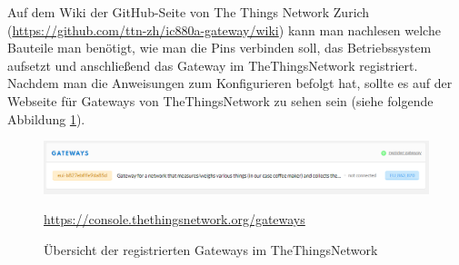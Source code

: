 Auf dem Wiki der GitHub-Seite von The Things Network Zurich (\url{https://github.com/ttn-zh/ic880a-gateway/wiki}) kann man nachlesen welche Bauteile man benötigt, wie man die Pins verbinden soll, das Betriebssystem aufsetzt und anschließend das Gateway im TheThingsNetwork registriert.\\
Nachdem man die Anweisungen zum Konfigurieren befolgt hat, sollte es auf der Webseite für Gateways von TheThingsNetwork zu sehen sein (siehe folgende Abbildung \ref{fig:lora-1}).
\begin{figure}[H]
    \center
    \includegraphics[width=16cm]{Bilder/lora-1.png}\\
    \caption{Übersicht der registrierten Gateways im TheThingsNetwork}
    \begin{center} \quelle\url{https://console.thethingsnetwork.org/gateways} \end{center}
    \label{fig:lora-1}
\end{figure}
\newpage
